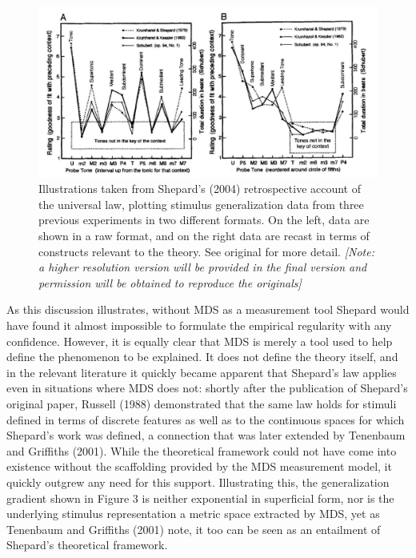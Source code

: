 \documentclass[english,doc]{apa6}
\begin{document}
\begin{figure}[t]
\includegraphics[width=5.51in]{shepard2} \caption{Illustrations taken from Shepard's (2004) retrospective account of the universal law, plotting stimulus generalization data from three previous experiments in two different formats. On the left, data are shown in a raw format, and on the right data are recast in terms of constructs relevant to the theory. See original for more detail. \emph{{[}Note: a higher resolution version will be provided in the final version and permission will be obtained to reproduce the originals{]}}}\label{fig:unnamed-chunk-2}
\end{figure}

As this discussion illustrates, without MDS as a measurement tool Shepard would have found it almost impossible to formulate the empirical regularity with any confidence. However, it is equally clear that MDS is merely a tool used to help define the phenomenon to be explained. It does not define the theory itself, and in the relevant literature it quickly became apparent that Shepard's law applies even in situations where MDS does not: shortly after the publication of Shepard's original paper, Russell (1988) demonstrated that the same law holds for stimuli defined in terms of discrete features as well as to the continuous spaces for which Shepard's work was defined, a connection that was later extended by Tenenbaum and Griffiths (2001). While the theoretical framework could not have come into existence without the scaffolding provided by the MDS measurement model, it quickly outgrew any need for this support. Illustrating this, the generalization gradient shown in Figure 3 is neither exponential in superficial form, nor is the underlying stimulus representation a metric space extracted by MDS, yet as Tenenbaum and Griffiths (2001) note, it too can be seen as an entailment of Shepard's theoretical framework.
\end{document}
